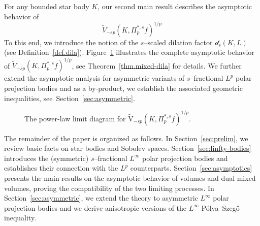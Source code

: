 \documentclass[11pt, reqno]{article}
\theoremstyle{definition}
\numberwithin{equation}{section}
\newcommand{\vtil}{\widetilde{\mathrm{V}}}
\newcommand{\dila}{\mathscr{d}}
\begin{document}
\medskip

For any bounded star body $K$, our second main result describes the asymptotic behavior of
\[
\widetilde{V}_{-sp}(K, \Pi^{\ast,s}_p f)^{1/p}
\]
To this end, we introduce the notion of the $s$--scaled dilation factor $\dila_s(K,L)$ (see Definition~\ref{def.dila}).
Figure~\ref{fig:vtil^1/p} illustrates the complete asymptotic behavior of $\widetilde{V}_{-sp}(K, \Pi^{\ast,s}_p f)^{1/p}$, see Theorem~\ref{thm.mixed-dila} for details.
We further extend the asymptotic analysis for asymmetric variants of $s$--fractional $L^p$ polar projection bodies and as a by-product, we establish the associated geometric inequalities, see~Section~\ref{sec:asymmetric}.

\begin{figure}[H]
\centering
{}
\caption{The power-law limit diagram for $\vtil_{-sp}(K, \Pi^{\ast, s}_p f)^{1/p}$.}
\label{fig:vtil^1/p}
\end{figure}

\medskip

The remainder of the paper is organized as follows. 
In Section~\ref{sec:prelim}, we review basic facts on star bodies and Sobolev spaces. 
Section~\ref{sec:linfty-bodies} introduces the (symmetric) $s$--fractional $L^\infty$ polar projection bodies and establishes their connection with the $L^p$ counterparts. 
Section~\ref{sec:asymptotics} presents the main results on the asymptotic behavior of volumes and dual mixed volumes, proving the compatibility of the two limiting processes. 
In Section~\ref{sec:asymmetric}, we extend the theory to asymmetric $L^\infty$ polar projection bodies and we derive anisotropic versions of the $L^\infty$ P\'olya--Szeg\H{o} inequality.
\end{document}
